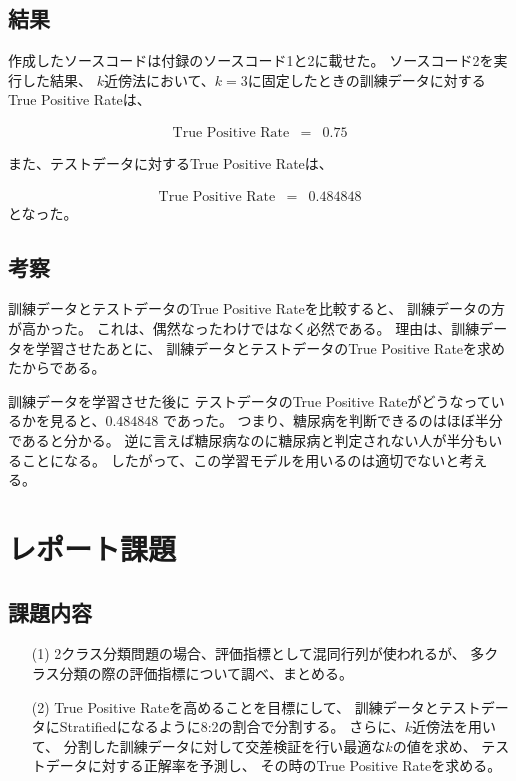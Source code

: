 \documentclass[12pt]{jarticle}
\begin{document}
\subsection{結果}
作成したソースコードは付録のソースコード1と2に載せた。
ソースコード2を実行した結果、
$k$近傍法において、$k=3$に固定したときの訓練データに対するTrue Positive Rateは、

\begin{eqnarray}
    \text{True Positive Rate}&=& 0.75 \nonumber
\end{eqnarray}

また、テストデータに対するTrue Positive Rateは、

\begin{eqnarray}
    \text{True Positive Rate}&=& 0.484848 \nonumber
\end{eqnarray}
となった。

\clearpage

\subsection{考察}
訓練データとテストデータのTrue Positive Rateを比較すると、
訓練データの方が高かった。
これは、偶然なったわけではなく必然である。
理由は、訓練データを学習させたあとに、
訓練データとテストデータのTrue Positive Rateを求めたからである。

訓練データを学習させた後に
テストデータのTrue Positive Rateがどうなっているかを見ると、$0.484848$
であった。
つまり、糖尿病を判断できるのはほぼ半分であると分かる。
逆に言えば糖尿病なのに糖尿病と判定されない人が半分もいることになる。
したがって、この学習モデルを用いるのは適切でないと考える。

\section{レポート課題}
\subsection{課題内容}
\begin{itemize}
    \item [(1)]2クラス分類問題の場合、評価指標として混同行列が使われるが、
          多クラス分類の際の評価指標について調べ、まとめる。
    \item [(2)]True Positive Rateを高めることを目標にして、
          訓練データとテストデータにStratifiedになるように8:2の割合で分割する。
          さらに、$k$近傍法を用いて、
          分割した訓練データに対して交差検証を行い最適な$k$の値を求め、
          テストデータに対する正解率を予測し、
          その時のTrue Positive Rateを求める。
\end{itemize}
\end{document}
